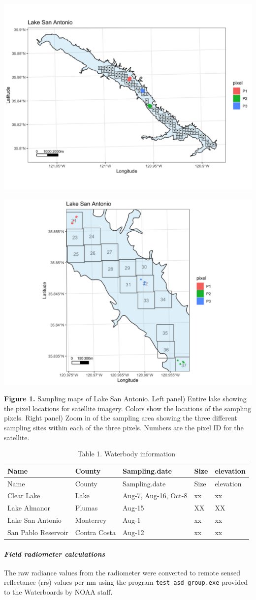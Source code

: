 \documentclass[]{article}
\let\oldparagraph\paragraph
\renewcommand{\paragraph}[1]{\oldparagraph{#1}\mbox{}}
\begin{document}
\begin{center}\includegraphics[width=0.3\linewidth]{../Data/20190801_LakeSanAntonio/lsa_lake_map} \end{center}

\begin{center}\includegraphics[width=0.3\linewidth]{../Data/20190801_LakeSanAntonio/lsa_lake_bbox_map} \end{center}

\textbf{Figure 1.} Sampling maps of Lake San Antonio. Left panel) Entire
lake showing the pixel locations for satellite imagery. Colors show the
locations of the sampling pixels. Right panel) Zoom in of the sampling
area showing the three different sampling sites within each of the three
pixels. Numbers are the pixel ID for the satellite.

\begin{longtable}[]{@{}lllll@{}}
\caption{Table 1. Waterbody information}\tabularnewline
\toprule
Name & County & Sampling.date & Size & elevation\tabularnewline
\midrule
\endfirsthead
\toprule
Name & County & Sampling.date & Size & elevation\tabularnewline
\midrule
\endhead
Clear Lake & Lake & Aug-7, Aug-16, Oct-8 & xx & xx\tabularnewline
Lake Almanor & Plumas & Aug-15 & XX & XX\tabularnewline
Lake San Antonio & Monterrey & Aug-1 & xx & xx\tabularnewline
San Pablo Reservoir & Contra Costa & Aug-12 & xx & xx\tabularnewline
\bottomrule
\end{longtable}

\hypertarget{field-radiometer-calculations}{%
\paragraph{\texorpdfstring{\emph{Field radiometer
calculations}}{Field radiometer calculations}}\label{field-radiometer-calculations}}

The raw radiance values from the radiometer were converted to remote
sensed reflectance (rrs) values per nm using the program
\texttt{test\_asd\_group.exe} provided to the Waterboards by NOAA staff.
\end{document}

